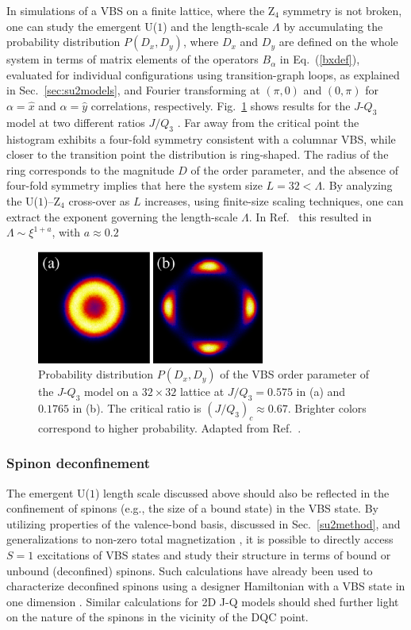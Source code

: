 \documentclass[10pt,pre,aps,twocolumn,showpacs,subscriptaddresses,floatfix]{revtex4}
\begin{document}
In simulations of a VBS on a finite lattice, where the Z$_4$ symmetry is not broken, one can study the emergent U($1$) and the length-scale $\Lambda$ by 
accumulating the probability distribution $P(D_x,D_y)$, where $D_x$ and $D_y$ are defined on the whole system in terms of matrix elements of the operators 
$B_\alpha$ in Eq.~(\ref{bxdef}), evaluated for individual configurations using transition-graph loops, as explained in Sec.~\ref{sec:su2models}, and Fourier 
transforming at $(\pi,0)$ and $(0,\pi)$ for $\alpha=\hat x$ and $\alpha=\hat y$ correlations, respectively. Fig.~\ref{jq3histo} shows results for the $J$-$Q_3$ 
model at two different ratios $J/Q_3$ \cite{lou2009:sun}. Far away from the critical point the histogram exhibits a four-fold symmetry consistent with a columnar 
VBS, while closer to the transition point the distribution is ring-shaped. The radius of the ring corresponds to the magnitude $D$ of the order parameter, and the 
absence of four-fold symmetry implies that here the system size $L=32 < \Lambda$. By analyzing the U($1$)--Z$_4$ cross-over as $L$ increases, using finite-size 
scaling techniques, one can extract the exponent governing the length-scale $\Lambda$. In Ref.~\cite{lou2009:sun} this resulted in  $\Lambda \sim \xi^{1+a}$, with 
$a \approx 0.2$ 


\begin{figure}
\includegraphics[width=7.5cm, clip]{fig05.eps}
\caption{Probability distribution $P(D_x,D_y)$ of the VBS order parameter of the $J$-$Q_3$ model on a $32\times 32$
lattice at $J/Q_3 = 0.575$ in (a) and $0.1765$ in (b). The critical ratio is $(J/Q_3)_c \approx 0.67$. Brighter colors
correspond to higher probability. Adapted from Ref.~\cite{lou2009:sun}.}  
\label{jq3histo}
\end{figure}

\subsubsection{Spinon deconfinement}

The emergent U($1$) length scale discussed above should also be reflected in the confinement of spinons (e.g., the size of a bound state) in the VBS state. By utilizing 
properties of the valence-bond basis, discussed in Sec.~\ref{su2method}, and generalizations to non-zero total magnetization \cite{Banerjee10b,Wang10}, it is 
possible to directly access $S=1$ excitations of VBS states and study their structure in terms of bound or unbound (deconfined) spinons. Such calculations have 
already been used to characterize deconfined spinons using a designer Hamiltonian with a VBS state in one dimension \cite{Tang11a}. 
Similar calculations for 2D J-Q models should shed further light on the nature of the spinons in the vicinity of the DQC point.
\end{document}
